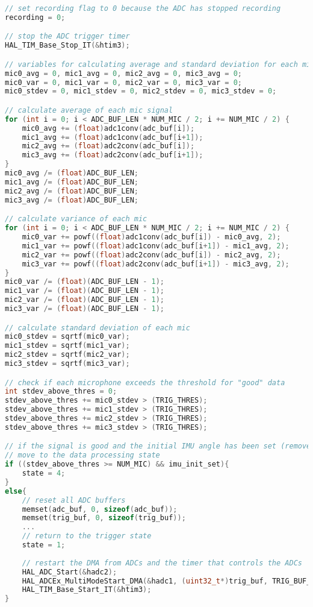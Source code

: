 \documentclass[11pt]{ucthesisCP}
\begin{document}
\begin{lstlisting}[language=C++]
// set recording flag to 0 because the ADC has stopped recording
recording = 0;

// stop the ADC trigger timer
HAL_TIM_Base_Stop_IT(&htim3);

// variables for calculating average and standard deviation for each microphone
mic0_avg = 0, mic1_avg = 0, mic2_avg = 0, mic3_avg = 0;
mic0_var = 0, mic1_var = 0, mic2_var = 0, mic3_var = 0;
mic0_stdev = 0, mic1_stdev = 0, mic2_stdev = 0, mic3_stdev = 0;

// calculate average of each mic signal
for (int i = 0; i < ADC_BUF_LEN * NUM_MIC / 2; i += NUM_MIC / 2) {
	mic0_avg += (float)adc1conv(adc_buf[i]);
	mic1_avg += (float)adc1conv(adc_buf[i+1]);
	mic2_avg += (float)adc2conv(adc_buf[i]);
	mic3_avg += (float)adc2conv(adc_buf[i+1]);
}
mic0_avg /= (float)ADC_BUF_LEN;
mic1_avg /= (float)ADC_BUF_LEN;
mic2_avg /= (float)ADC_BUF_LEN;
mic3_avg /= (float)ADC_BUF_LEN;

// calculate variance of each mic
for (int i = 0; i < ADC_BUF_LEN * NUM_MIC / 2; i += NUM_MIC / 2) {
	mic0_var += powf((float)adc1conv(adc_buf[i]) - mic0_avg, 2);
	mic1_var += powf((float)adc1conv(adc_buf[i+1]) - mic1_avg, 2);
	mic2_var += powf((float)adc2conv(adc_buf[i]) - mic2_avg, 2);
	mic3_var += powf((float)adc2conv(adc_buf[i+1]) - mic3_avg, 2);
}
mic0_var /= (float)(ADC_BUF_LEN - 1);
mic1_var /= (float)(ADC_BUF_LEN - 1);
mic2_var /= (float)(ADC_BUF_LEN - 1);
mic3_var /= (float)(ADC_BUF_LEN - 1);

// calculate standard deviation of each mic
mic0_stdev = sqrtf(mic0_var);
mic1_stdev = sqrtf(mic1_var);
mic2_stdev = sqrtf(mic2_var);
mic3_stdev = sqrtf(mic3_var);

// check if each microphone exceeds the threshold for "good" data
int stdev_above_thres = 0;
stdev_above_thres += mic0_stdev > (TRIG_THRES);
stdev_above_thres += mic1_stdev > (TRIG_THRES);
stdev_above_thres += mic2_stdev > (TRIG_THRES);
stdev_above_thres += mic3_stdev > (TRIG_THRES);

// if the signal is good and the initial IMU angle has been set (remove yaw), then
// move to the data processing state
if ((stdev_above_thres >= NUM_MIC) && imu_init_set){
	state = 4;
}
else{
	// reset all ADC buffers
	memset(adc_buf, 0, sizeof(adc_buf));
	memset(trig_buf, 0, sizeof(trig_buf));
	...
	// return to the trigger state
	state = 1;
	
	// restart the DMA from ADCs and the timer that controls the ADCs
	HAL_ADC_Start(&hadc2);
	HAL_ADCEx_MultiModeStart_DMA(&hadc1, (uint32_t*)trig_buf, TRIG_BUF_LEN * NUM_MIC / 2);
	HAL_TIM_Base_Start_IT(&htim3);
}
\end{lstlisting}
\end{document}

